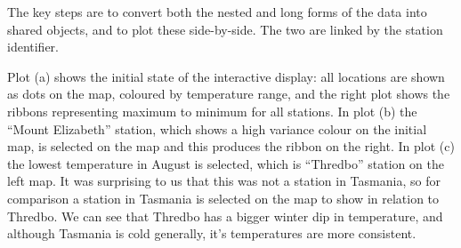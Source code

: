 \documentclass[
  shortnames]{jss}
\newenvironment{Shaded}{\begin{snugshade}}{\end{snugshade}}
\newcommand{\AttributeTok}[1]{\textcolor[rgb]{0.77,0.63,0.00}{#1}}
\newcommand{\FunctionTok}[1]{\textcolor[rgb]{0.00,0.00,0.00}{#1}}
\newcommand{\NormalTok}[1]{#1}
\newcommand{\OtherTok}[1]{\textcolor[rgb]{0.56,0.35,0.01}{#1}}
\newcommand{\SpecialCharTok}[1]{\textcolor[rgb]{0.00,0.00,0.00}{#1}}
\newcommand{\StringTok}[1]{\textcolor[rgb]{0.31,0.60,0.02}{#1}}
\begin{document}
The key steps are to convert both the nested and long forms of the data into shared  objects, and to plot these side-by-side. The two are linked by the station identifier.

\begin{Shaded}
\end{Shaded}

Plot (a) shows the initial state of the interactive display: all locations are shown as dots on the map, coloured by temperature range, and the right plot shows the ribbons representing maximum to minimum for all stations. In plot (b) the ``Mount Elizabeth'' station, which shows a high variance colour on the initial map, is selected on the map and this produces the ribbon on the right. In plot (c) the lowest temperature in August is selected, which is ``Thredbo'' station on the left map. It was surprising to us that this was not a station in Tasmania, so for comparison a station in Tasmania is selected on the map to show in relation to Thredbo. We can see that Thredbo has a bigger winter dip in temperature, and although Tasmania is cold generally, it's temperatures are more consistent.
\end{document}
